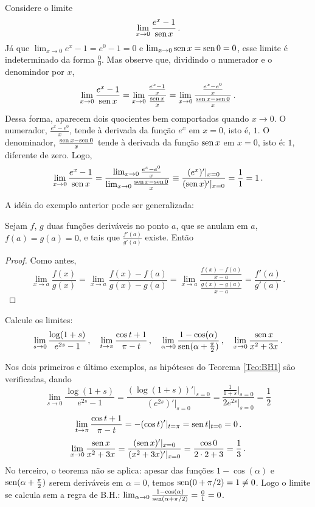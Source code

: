 \begin{ex}
Considere o limite
$$\lim_{x\to 0}\frac{e^x-1}{\operatorname{sen} x}\,.$$
Já que $\lim_{x\to 0}e^x-1=e^0-1=0$ e $\lim_{x\to 0}\operatorname{sen} x=\operatorname{sen} 0=0$, esse
limite é indeterminado da forma $\tfrac00$. Mas observe que,
dividindo o numerador e o denomindor por $x$, 
$$\lim_{x\to 0}\frac{e^x-1}{\operatorname{sen} x}=\lim_{x\to
0}\frac{\frac{e^x-1}{x}}{\frac{\operatorname{sen} x}{x}}=
\lim_{x\to 0}\frac{\frac{e^x-e^0}{x}}{\frac{\operatorname{sen} x-\operatorname{sen} 0}{x}}\,.
$$
Dessa forma, aparecem dois quocientes bem comportados quando $x\to 0$. O
numerador, $\frac{e^x-e^0}{x}$, tende à derivada da função $e^x$ em $x=0$, isto
é, $1$. O denominador, $\frac{\operatorname{sen} x-\operatorname{sen} 0}{x}$ tende à derivada da função
$\operatorname{sen} x$ em $x=0$, isto é: $1$, diferente de zero. Logo,
$$\lim_{x\to 0}\frac{e^x-1}{\operatorname{sen} x}=\frac{\lim_{x\to
0}\frac{e^x-e^0}{x}}{\lim_{x\to 0}\frac{\operatorname{sen} x-\operatorname{sen} 0}{x}}\equiv
\frac{(e^x)'|_{x=0}}{(\operatorname{sen} x)'|_{x=0}}=\frac{1}{1}=1\,.
$$
\end{ex}

A idéia do exemplo anterior pode ser generalizada:

\begin{teo}\label{Teo:BH1}
Sejam $f$, $g$ duas funções deriváveis no ponto $a$, que se
anulam em $a$, $f(a)=g(a)=0$, e
tais que $\frac{f'(a)}{g'(a)}$ existe. Então 
\end{teo}
\begin{proof}
 Como antes, 
$$
\lim_{x\to a}\frac{f(x)}{g(x)}=
\lim_{x\to a}\frac{f(x)-f(a)}{g(x)-g(a)}=
\lim_{x\to a}\frac{\frac{f(x)-f(a)}{x-a}}{\frac{g(x)-g(a)}{x-a}}=
\frac{f'(a)}{g'(a)}\,.
$$
\end{proof}


\begin{exo}
Calcule os limites:
$$\lim_{s\to 0}\frac{\log(1+s)}{e^{2s}-1}\,,\quad
\lim_{t\to \pi}\frac{\cos t+1}{\pi-t}\,,\quad 
\lim_{\alpha\to
0}\frac{1-\cos(\alpha)}{\operatorname{sen}(\alpha+\frac{\pi}{2})}\,,\quad
\lim_{x\to 0}\frac{\operatorname{sen} x}{x^2+3x}
\,.
$$
\begin{sol}
Nos dois primeiros e último exemplos, as hipóteses do Teorema \ref{Teo:BH1} são
verificadas, dando
 $$\lim_{s\to 0}\frac{\log(1+s)}{e^{2s}-1}=
\frac{(\log(1+s))'|_{s=0}}{(e^{2s})'|_{s=0}}
=\frac{\frac{1}{1+s}|_{s=0}}{2e^{2s}|_{s=0}}=\frac{1}{2}$$
$$
\lim_{t\to \pi}\frac{\cos t+1}{\pi-t}=-(\cos t)'|_{t=\pi}=\operatorname{sen} t|_{t=0}=0\,.$$
$$
\lim_{x\to 0}\frac{\operatorname{sen} x}{x^2+3x}=\frac{(\operatorname{sen}
x)'|_{x=0}}{(x^2+3x)'|_{x=0}}
=\frac{\cos 0}{2\cdot 2+3}=\frac{1}{3}\,.
$$
No terceiro, o teorema não se aplica: apesar das funções $1-\cos(\alpha)$ e 
$\operatorname{sen}(\alpha+\frac{\pi}{2})$ serem deriváveis em $\alpha=0$, temos
$\operatorname{sen} (0+\pi/2)=1\neq 0$. Logo o limite se calcula sem a regra de B.H.:
$\lim_{\alpha\to 0}\frac{1-\cos(\alpha)}{\operatorname{sen} (\alpha+\pi/2)}=\tfrac01=0$.
\end{sol}
\end{exo}

